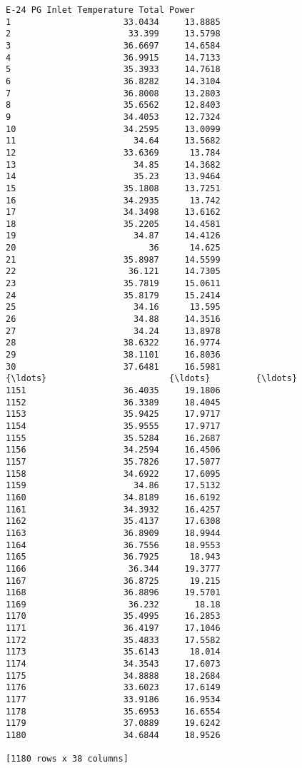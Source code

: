\documentclass[11pt]{article}
\begin{document}
\begin{tcolorbox}[breakable, size=fbox, boxrule=.5pt, pad at break*=1mm, opacityfill=0]
\begin{Verbatim}[commandchars=\\\{\}]
     E-24 PG Inlet Temperature Total Power
1                      33.0434     13.8885
2                       33.399     13.5798
3                      36.6697     14.6584
4                      36.9915     14.7133
5                      35.3933     14.7618
6                      36.8282     14.3104
7                      36.8008     13.2803
8                      35.6562     12.8403
9                      34.4053     12.7324
10                     34.2595     13.0099
11                       34.64     13.5682
12                     33.6369      13.784
13                       34.85     14.3682
14                       35.23     13.9464
15                     35.1808     13.7251
16                     34.2935      13.742
17                     34.3498     13.6162
18                     35.2205     14.4581
19                       34.87     14.4126
20                          36      14.625
21                     35.8987     14.5599
22                      36.121     14.7305
23                     35.7819     15.0611
24                     35.8179     15.2414
25                       34.16      13.595
26                       34.88     14.3516
27                       34.24     13.8978
28                     38.6322     16.9774
29                     38.1101     16.8036
30                     37.6481     16.5981
{\ldots}                        {\ldots}         {\ldots}
1151                   36.4035     19.1806
1152                   36.3389     18.4045
1153                   35.9425     17.9717
1154                   35.9555     17.9717
1155                   35.5284     16.2687
1156                   34.2594     16.4506
1157                   35.7826     17.5077
1158                   34.6922     17.6095
1159                     34.86     17.5132
1160                   34.8189     16.6192
1161                   34.3932     16.4257
1162                   35.4137     17.6308
1163                   36.8909     18.9944
1164                   36.7556     18.9553
1165                   36.7925      18.943
1166                    36.344     19.3777
1167                   36.8725      19.215
1168                   36.8896     19.5701
1169                    36.232       18.18
1170                   35.4995     16.2853
1171                   36.4197     17.1046
1172                   35.4833     17.5582
1173                   35.6143      18.014
1174                   34.3543     17.6073
1175                   34.8888     18.2684
1176                   33.6023     17.6149
1177                   33.9186     16.9534
1178                   35.6953     16.6554
1179                   37.0889     19.6242
1180                   34.6844     18.9526

[1180 rows x 38 columns]
\end{Verbatim}
\end{tcolorbox}
        
\end{document}
